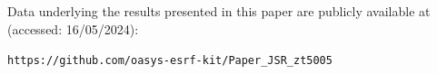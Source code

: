 \documentclass[preprint]{iucr}
\begin{document}







Data underlying the results presented in this paper are publicly available at (accessed: 16/05/2024):
\begin{center}
\small{\texttt{https://github.com/oasys-esrf-kit/Paper\_JSR\_zt5005}}
\end{center}


\end{document}
